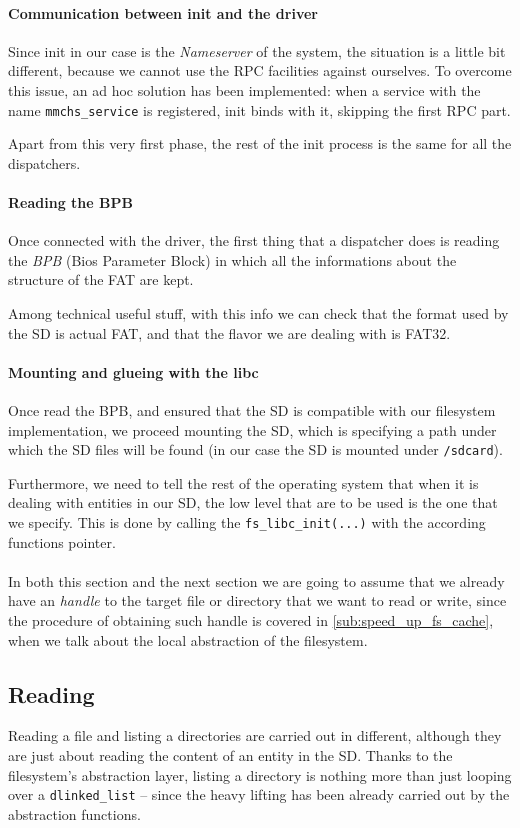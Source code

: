 \documentclass[a4paper,twoside,openright]{report}
\begin{document}
\paragraph{Communication between init and the driver}
Since init in our case is the \emph{Nameserver} of the system, the situation is a little bit different, because we cannot use the RPC facilities against ourselves.
To overcome this issue, an ad hoc solution has been implemented: when a service with the name \texttt{mmchs\_service} is registered, init binds with it, skipping the first RPC part.

Apart from this very first phase, the rest of the init process is the same for all the dispatchers.

\paragraph{Reading the BPB}
Once connected with the driver, the first thing that a dispatcher does is reading the \emph{BPB} (Bios Parameter Block) in which all the informations about the structure of the FAT are kept.

Among technical useful stuff, with this info we can check that the format used by the SD is actual FAT, and that the flavor we are dealing with is FAT32.

\paragraph{Mounting and glueing with the libc}
Once read the BPB, and ensured that the SD is compatible with our filesystem implementation, we proceed mounting the SD, which is specifying a path under which the SD files will be found (in our case the SD is mounted under \texttt{/sdcard}).

Furthermore, we need to tell the rest of the operating system that when it is dealing with entities in our SD, the low level that are to be used is the one that we specify. This is done by calling the \texttt{fs\_libc\_init(...)} with the according functions pointer.
\\
\\
In both this section and the next section we are going to assume that we already have an \emph{handle} to the target file or directory that we want to read or write, since the procedure of obtaining such handle is covered in \ref{sub:speed_up_fs_cache}, when we talk about the local abstraction of the filesystem. 

\subsection{Reading}
Reading a file and listing a directories are carried out in different, although they are just about reading the content of an entity in the SD.
Thanks to the filesystem's abstraction layer, listing a directory is nothing more than just looping over a \texttt{dlinked\_list} -- since the heavy lifting has been already carried out by the abstraction functions.
\end{document}
